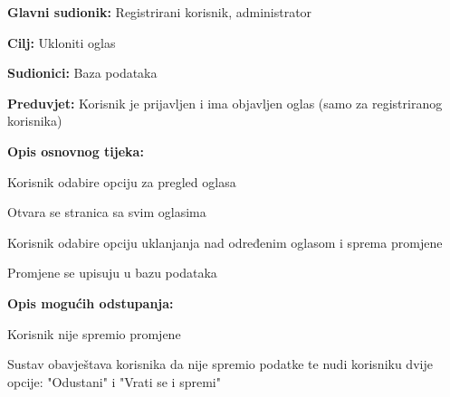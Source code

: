 				\noindent {}
					\begin{packed_item}
	
						\item \textbf{Glavni sudionik: }Registrirani korisnik, administrator
						\item  \textbf{Cilj:} Ukloniti oglas
						\item  \textbf{Sudionici:} Baza podataka
						\item  \textbf{Preduvjet:} Korisnik je prijavljen i ima objavljen oglas (samo za registriranog korisnika)
						\item  \textbf{Opis osnovnog tijeka:}
						
						\item[] \begin{packed_enum}
	
							\item Korisnik odabire opciju za pregled oglasa
							\item Otvara se stranica sa svim oglasima
							\item Korisnik odabire opciju uklanjanja nad određenim oglasom i sprema promjene
							\item Promjene se upisuju u bazu podataka

						\end{packed_enum}		
						
						\item  \textbf{Opis mogućih odstupanja:}
						
						\item[] \begin{packed_item}
	
							\item[4.a] Korisnik nije spremio promjene
								\begin{packed_item}
									\item Sustav obavještava korisnika da nije spremio podatke te nudi korisniku dvije opcije: "Odustani" i "Vrati se i spremi"
								\end{packed_item}
								
						\end{packed_item}				
					\end{packed_item}
					
